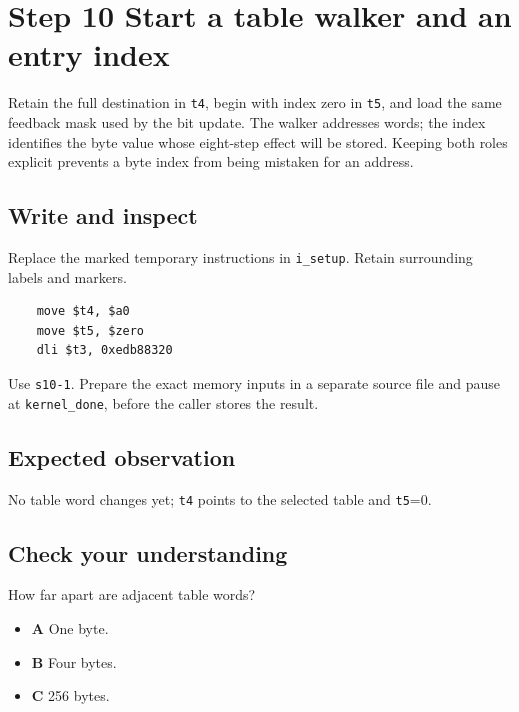 \section{Step 10 Start a table walker and an entry index}\label{crc-s10}

Retain the full destination in \texttt{t4}, begin with index zero in \texttt{t5}, and load the same feedback mask used by the bit update. The walker addresses words; the index identifies the byte value whose eight-step effect will be stored. Keeping both roles explicit prevents a byte index from being mistaken for an address.

\subsection{Write and inspect}
Replace the marked temporary instructions in \texttt{i\_setup}. Retain surrounding labels and markers.

\begin{verbatim}
    move $t4, $a0
    move $t5, $zero
    dli $t3, 0xedb88320
\end{verbatim}

Use \texttt{s10-1}. Prepare the exact memory inputs in a separate source file and pause at \texttt{kernel\_done}, before the caller stores the result.

\subsection{Expected observation}
No table word changes yet; \texttt{t4} points to the selected table and \texttt{t5}=0.

\subsection{Check your understanding}
How far apart are adjacent table words?

\begin{itemize}
  \item \textbf{A} One byte.
  \item \textbf{B} Four bytes.
  \item \textbf{C} 256 bytes.
\end{itemize}
